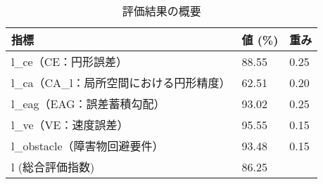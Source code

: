 \begin{table}[ht]
	\caption{評価結果の概要}
	\centering
	\begin{tabular}{l|l|l}
		\hline
		指標                        & 値 (\%) & 重み   \\ \hline
		l\_ce（CE：円形誤差）            & 88.55  & 0.25 \\
		l\_ca（CA\_l：局所空間における円形精度） & 62.51  & 0.20 \\
		l\_eag（EAG：誤差蓄積勾配）        & 93.02  & 0.25 \\
		l\_ve（VE：速度誤差）            & 95.55  & 0.15 \\
		l\_obstacle（障害物回避要件）      & 93.48  & 0.15 \\
		l (総合評価指数)                & 86.25  &      \\ \hline
	\end{tabular}
	\label{table:evaluation_index}
\end{table}


